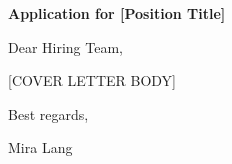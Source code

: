 \documentclass[12pt]{article}
\begin{document}
\textbf{Application for [Position Title]}

\vspace{0.5cm}

Dear Hiring Team,


[COVER LETTER BODY]

\vspace{0.5cm}

Best regards,

\vspace{1cm}

Mira Lang
\end{document}
